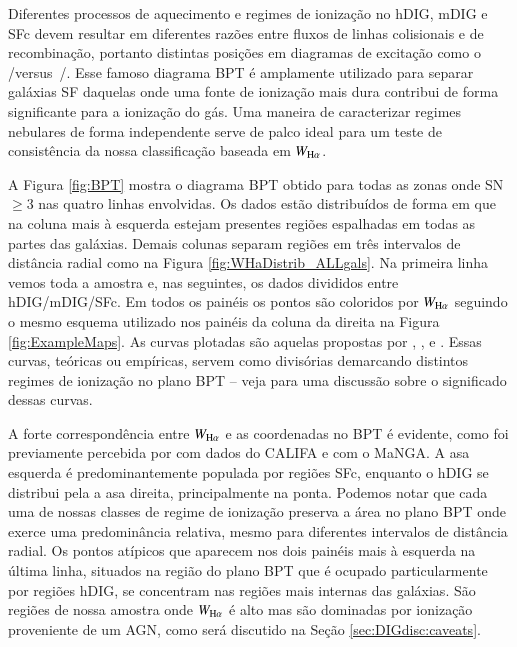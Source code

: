 Diferentes processos de aquecimento e regimes de ionização no hDIG, mDIG e SFc devem resultar em diferentes razões entre fluxos de linhas colisionais e de recombinação, portanto distintas posições em diagramas de excitação como o  \Oiii/\Hb versus\ \Nii/\Ha. Esse famoso diagrama BPT \citep*[após][]{Baldwin.Phillips.Terlevich.1981a} é amplamente utilizado para separar galáxias SF daquelas onde uma fonte de ionização mais dura contribui de forma significante para a ionização do gás. Uma maneira de caracterizar regimes nebulares de forma independente serve de palco ideal para um teste de consistência da nossa classificação baseada em $W_{\Ha}$.

A Figura \ref{fig:BPT} mostra o diagrama BPT obtido para todas as zonas onde SN $\ge 3$ nas quatro linhas envolvidas. Os dados estão distribuídos de forma em que na coluna mais à esquerda estejam presentes regiões espalhadas em todas as partes das galáxias. Demais colunas separam regiões em três intervalos de distância radial como na Figura \ref{fig:WHaDistrib_ALLgals}. Na primeira linha vemos toda a amostra e, nas seguintes, os dados divididos entre hDIG/mDIG/SFc. Em todos os painéis os pontos são coloridos por $W_{\Ha}$ seguindo o mesmo esquema utilizado nos painéis da coluna da direita na Figura \ref{fig:ExampleMaps}. As curvas plotadas são aquelas propostas por \citet[S06]{Stasinska.etal.2006a}, \citet[K03]{Kauffmann.etal.2003a}, e \citet[K01]{Kewley.etal.2001a}. Essas curvas, teóricas ou empíricas, servem como divisórias demarcando distintos regimes de ionização no plano BPT -- veja \citet{CidFernandes.etal.2011a} para uma discussão sobre o significado dessas curvas.

A forte correspondência entre $W_{\Ha}$ e as coordenadas no BPT é evidente, como foi previamente percebida por \citet{Morisset.etal.2016} com dados do CALIFA e \citet{Belfiore.etal.2016} com o MaNGA. A asa esquerda é predominantemente populada por regiões SFc, enquanto o hDIG se distribui pela a asa direita, principalmente na ponta. Podemos notar que cada uma de nossas classes de regime de ionização preserva a área no plano BPT onde exerce uma predominância relativa, mesmo para diferentes intervalos de distância radial. Os pontos atípicos que aparecem nos dois painéis mais à esquerda na última linha, situados na região do plano BPT que é ocupado particularmente por regiões hDIG, se concentram nas regiões mais internas das galáxias. São regiões de nossa amostra onde $W_{\Ha}$ é alto mas são dominadas por ionização proveniente de um AGN, como será discutido na Seção \ref{sec:DIGdisc:caveats}.

